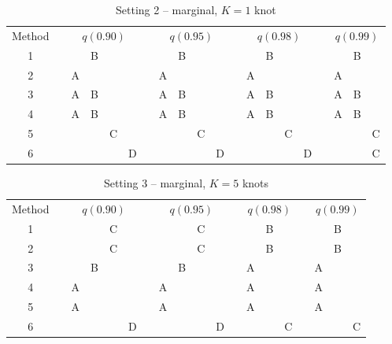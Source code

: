 \begin{table}[htbp]
  \centering
  \caption{Setting 2 -- \Skewt{} marginal, $K = 1$ knot}
  \label{sttbl:st1sim}
  \begin{tabular}{c c cccc c cccc c cccc c ccc}
  \toprule
    Method & \phantom{a} & \multicolumn{4}{c}{$q(0.90)$} & \phantom{a} & \multicolumn{4}{c}{$q(0.95)$} & \phantom{a} & \multicolumn{4}{c}{$q(0.98)$} & \phantom{a} & \multicolumn{3}{c}{$q(0.99)$} \\
    \cmidrule{1-1} \cmidrule{3-6} \cmidrule{8-11} \cmidrule{13-16} \cmidrule{18-20}
    1 &&   & B &   &   &&   & B &   &   &&   & B &   &   &&   & B &   \\
    2 && A &   &   &   && A &   &   &   && A &   &   &   && A &   &   \\
    3 && A & B &   &   && A & B &   &   && A & B &   &   && A & B &   \\
    4 && A & B &   &   && A & B &   &   && A & B &   &   && A & B &   \\
    5 &&   &   & C &   &&   &   & C &   &&   &   & C &   &&   &   & C \\
    6 &&   &   &   & D &&   &   &   & D &&   &   &   & D &&   &   & C \\
    \bottomrule
  \end{tabular}
\end{table}

\begin{table}[htbp]
  \centering
  \caption{Setting 3 -- \Skewt{} marginal, $K = 5$ knots}
  \label{sttbl:st5sim}
  \begin{tabular}{c c cccc c cccc c ccc c ccc}
  \toprule
    Method & \phantom{a} & \multicolumn{4}{c}{$q(0.90)$} & \phantom{a} & \multicolumn{4}{c}{$q(0.95)$} & \phantom{a} & \multicolumn{3}{c}{$q(0.98)$} & \phantom{a} & \multicolumn{3}{c}{$q(0.99)$} \\
    \cmidrule{1-1} \cmidrule{3-6} \cmidrule{8-11} \cmidrule{13-15} \cmidrule{17-19}
    1 &&   &   & C &   &&   &   & C &   &&   & B &   &&   & B &   \\
    2 &&   &   & C &   &&   &   & C &   &&   & B &   &&   & B &   \\
    3 &&   & B &   &   &&   & B &   &   && A &   &   && A &   &   \\
    4 && A &   &   &   && A &   &   &   && A &   &   && A &   &   \\
    5 && A &   &   &   && A &   &   &   && A &   &   && A &   &   \\
    6 &&   &   &   & D &&   &   &   & D &&   &   & C &&   &   & C \\
    \bottomrule
  \end{tabular}
\end{table}

